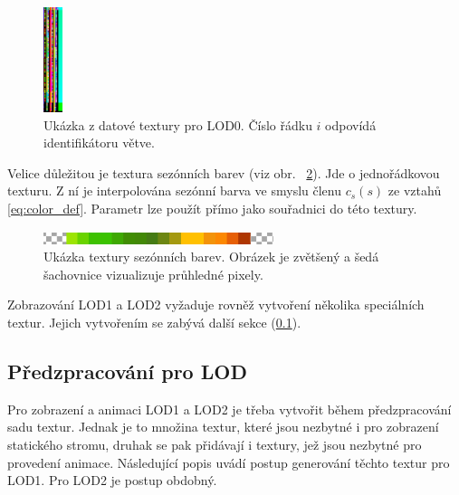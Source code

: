 \begin{figure}[!hbt]
\begin{center}
\includegraphics[width=0.05\textwidth]{./figures/branchDataTextureLOD0.png}
\end{center}
\caption[Ukázka z datové textury pro LOD0]%
{Ukázka z datové textury pro LOD0. Číslo řádku $i$ odpovídá identifikátoru větve.\label{fig:branchDataTextureLOD0}
}
\end{figure}
Velice důležitou je textura sezónních barev (viz obr. ~\ref{fig:seasonMap}). Jde o jednořádkovou texturu. Z ní je interpolována sezónní barva ve smyslu členu $c_s(s)$ ze vztahů \eqref{eq:color_def}. Parametr  lze použít přímo jako souřadnici do této textury. 
\begin{figure}[!hbt]
\begin{center}
\includegraphics[width=0.6\textwidth]{./figures/seasonTex.png}
\end{center}
\caption[Ukázka textury sezónních barev]%
{Ukázka textury sezónních barev. Obrázek je zvětšený a šedá šachovnice vizualizuje průhledné pixely.\label{fig:seasonMap}
}
\end{figure}

Zobrazování LOD1 a LOD2 vyžaduje rovněž vytvoření několika speciálních textur. Jejich vytvořením se zabývá další sekce (\ref{sec:preprocessLOD}).

\pagebreak
\subsection{Předzpracování pro LOD}
\label{sec:preprocessLOD}
Pro zobrazení a animaci LOD1 a LOD2 je třeba vytvořit během předzpracování sadu textur. Jednak je to množina textur, které jsou nezbytné i pro zobrazení statického stromu, druhak se pak přidávají i textury, jež jsou nezbytné pro provedení animace. Následující popis uvádí postup generování těchto textur pro LOD1. Pro LOD2 je postup obdobný.

